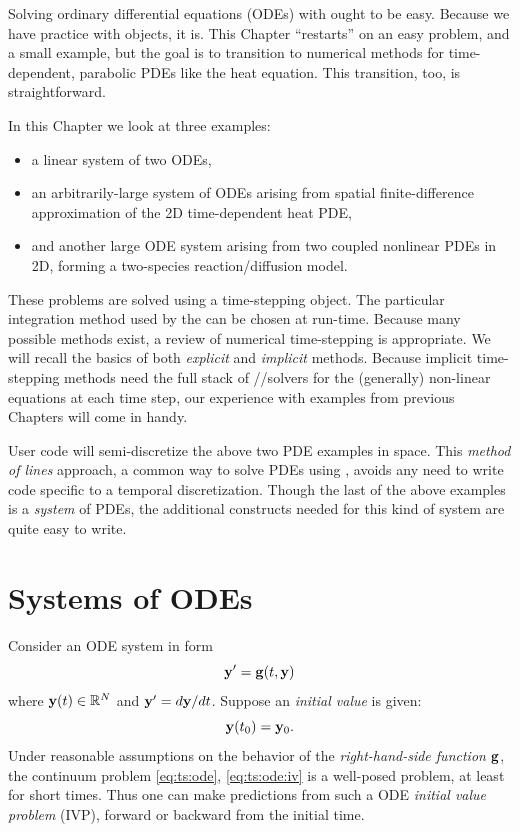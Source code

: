 
Solving ordinary differential equations (ODEs) with \PETSc ought to be easy.  Because we have practice with \PETSc objects, it is.  This Chapter ``restarts'' on an easy problem, and a small example, but the goal is to transition to numerical methods for time-dependent, parabolic PDEs like the heat equation.  This transition, too, is straightforward.

In this Chapter we look at three examples:
\begin{itemize}
\item a linear system of two ODEs,
\item an arbitrarily-large system of ODEs arising from spatial finite-difference approximation of the 2D time-dependent heat PDE,
\item and another large ODE system arising from two coupled nonlinear PDEs in 2D, forming a two-species reaction/diffusion model.
\end{itemize}

These problems are solved using a \PETSc \pTS time-stepping object.  The particular integration method used by the \pTS can be chosen at run-time.  Because many possible methods exist, a review of numerical time-stepping is appropriate.  We will recall the basics of both \emph{explicit} and \emph{implicit} methods.  Because implicit time-stepping methods need the full stack of \pSNES/\pKSP/\pPC solvers for the (generally) non-linear equations at each time step, our experience with \pSNES examples from previous Chapters will come in handy.

User code will semi-discretize the above two PDE examples in space.  This \emph{method of lines} approach, a common way to solve PDEs using \PETSc \pTS, avoids any need to write code specific to a temporal discretization.  Though the last of the above examples is a \emph{system} of PDEs, the additional \PETSc constructs needed for this kind of system are quite easy to write.


\section{Systems of ODEs}

Consider an ODE system in form
\begin{equation}
\mathbf{y}' = \mathbf{g}(t,\mathbf{y})  \label{eq:ts:ode}
\end{equation}
where $\mathbf{y}(t) \in \mathbb{R}^N$ and $\mathbf{y}'=d\mathbf{y}/dt$.  Suppose an \emph{initial value} is given:
\begin{equation}
\mathbf{y}(t_0) = \mathbf{y}_0.  \label{eq:ts:ode:iv}
\end{equation}
Under reasonable assumptions on the behavior of the \emph{right-hand-side function} $\mathbf{g}$, the continuum problem \eqref{eq:ts:ode}, \eqref{eq:ts:ode:iv} is a well-posed problem, at least for short times.  Thus one can make predictions from such a ODE \emph{initial value problem} (IVP), forward or backward from the initial time.

